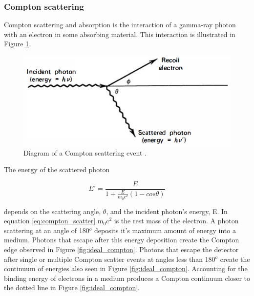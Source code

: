 \subsubsection{Compton scattering}

Compton scattering and absorption is the interaction of a gamma-ray photon with an electron in some absorbing material. This interaction is illustrated in Figure \ref{fig:compton_scatter}. 



\begin{figure}[H]
\centering
\includegraphics[width=0.8\linewidth]{images/compton_scatter}
\caption{Diagram of a Compton scattering event \cite{knoll}.}
\label{fig:compton_scatter}
\end{figure}

The energy of the scattered photon

\begin{equation} \label{eq:compton_scatter}
E' = \frac{E}{1 + \frac{E}{m_{0} c^2} (1-cos\theta)}
\end{equation}

depends on the scattering angle, $\theta$, and the incident photon's energy, E. In equation \ref{eq:compton_scatter} m$_{0}$c$^{2}$ is the rest mass of the electron. A photon scattering at an angle of 180$^{o}$ deposits it's maximum amount of energy into a medium. Photons that escape after this energy deposition create the Compton edge observed in Figure \ref{fig:ideal_compton}. Photons that escape the detector after single or multiple Compton scatter events at angles less than 180$^{o}$ create the continuum of energies also seen in Figure \ref{fig:ideal_compton}. Accounting for the binding energy of electrons in a medium produces a Compton continuum closer to the dotted line in Figure \ref{fig:ideal_compton}.

